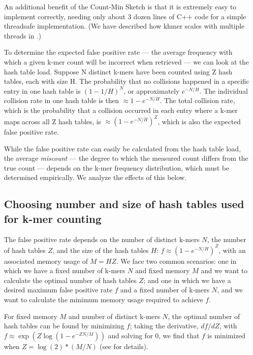 An additional benefit of the Count-Min Sketch is that it is extremely
easy to implement correctly, needing only about 3 dozen lines of C++
code for a simple threadsafe implementation.  (We have
described how khmer scales with multiple threads in
\cite{McDonald2013}.)

To determine the expected false positive rate --- the average frequency with
which a given k-mer count will be incorrect when retrieved --- we can
look at the hash table load. Suppose N distinct k-mers have been counted
using Z hash tables, each with size H.  The probability that no
collisions happened in a specific entry in one hash table is
$(1-1/H)^{N}$, or approximately $e^{-N/H}$. The individual collision
rate in one hash table is then $\approx 1-e^{-N/H}$. The total
collision rate, which is the probability that a collision occurred in
each entry where a k-mer maps across all Z hash tables, is $\approx
(1-e^{-N/H})^{Z}$, which is also the expected false positive rate.

While the false positive rate can easily be calculated from the hash table
load, the average {\em miscount} --- the degree to which the measured
count differs from the true count --- depends on the k-mer frequency
distribution, which must be determined empirically.  We analyze the
effects of this below.


\subsection{Choosing number and size of hash tables used for k-mer counting}

The false positive rate depends on the number of distinct k-mers $N$,
the number of hash tables $Z$, and the size of the hash tables $H$: $f
\approx (1-e^{-N/H})^{Z}$, with an associated memory usage of $M = H
Z$.  We face two common scenarios: one in which we have a fixed number
of k-mers $N$ and fixed memory $M$ and we want to calculate the
optimal number of hash tables $Z$; and one in which we have a desired
maximum false positive rate $f$ and a fixed number of k-mers $N$, and
we want to calculate the minimum memory usage required to achieve $f$.

For fixed memory $M$ and number of distinct k-mers $N$, the optimal
number of hash tables can be found by minimizing $f$; taking the
derivative, $df/dZ$, with $f \approx \exp(Z \log(1-e^{-ZN/M}))$ and solving
for 0, we find that $f$ is minimized when $Z=\log(2)*(M/N)$ (see
\cite{broder2004network} for details).

